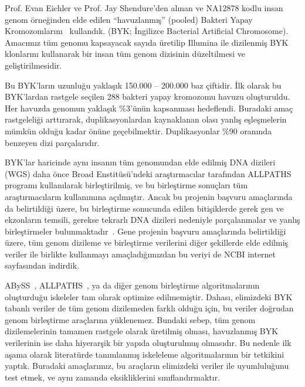 \documentclass[11pt]{article}
\begin{document}
Prof. Evan Eichler ve Prof. Jay Shendure'den alınan ve NA12878 kodlu insan genom örneğinden elde edilen ``havuzlanmış'' (pooled) Bakteri Yapay Kromozomlarını~\cite{Kitzman2011} kullandık. 
(BYK; İngilizce Bacterial Artificial Chromosome). 
Amacımız tüm genomu kapsayacak sayıda üretilip Illumina ile dizilenmiş BYK klonlarını kullanarak bir insan tüm genom dizisinin düzeltilmesi ve geliştirilmesidir.
	
Bu BYK’ların uzunluğu yaklaşık 150.000 – 200.000 baz çiftidir. İlk olarak bu BYK'lardan rastgele seçilen 288 bakteri yapay kromozomu havuzu oluşturuldu. Her havuzda genomun yaklaşık \%3'ünün 
kapsanması hedeflendi. Buradaki amaç rastgeleliği arttırarak, duplikasyonlardan kaynaklanan olası yanlış eşleşmelerin mümkün olduğu kadar önüne geçebilmektir. 
Duplikasyonlar \%90 oranında benzeyen dizi parçalarıdır. 

BYK’lar haricinde aynı insanın tüm genomundan elde edilmiş DNA dizileri (WGS) daha önce Broad Enstitüsü’ndeki araştırmacılar tarafından ALLPATHS~\cite{Gnerre2011} programı kullanılarak birleştirilmiş, ve bu birleştirme sonuçları tüm araştırmacıların kullanımına açılmıştır. Ancak bu projenin başvuru amaçlarında da belirtildiği üzere, bu birleştirme sonucunda edilen bitişiklerde gerek gen ve ekzonların temsili, gerekse tekrarlı DNA dizileri nedeniyle parçalanmalar ve yanlış birleştirmeler bulunmaktadır~\cite{Alkan2011c}. Gene projenin başvuru amaçlarında belirtildiği üzere, tüm genom dizileme ve birleştirme verilerini diğer şekillerde elde edilmiş veriler ile birlikte kullanmayı amaçladığımızdan bu veriyi de NCBI internet sayfasından indirdik.

ABySS~\cite{Simpson2009}, ALLPATHS~\cite{Simpson2009}, ya da diğer genom birleştirme algoritmalarının oluşturduğu iskeleler tam olarak optimize edilmemiştir. Dahası, elimizdeki BYK tabanlı veriler de tüm genom dizilemeden farklı olduğu için, bu veriler doğrudan genom birleştirme araçlarına yüklenemez. Bundaki sebep, tüm genom dizilemelerinin tamamen rastgele olarak üretilmiş olması, havuzlanmış BYK verilerinin ise daha hiyerarşik bir yapıda oluşturulmuş olmasıdır. Bu nedenle ilk aşama olarak literatürde tanımlanmış iskeleleme algoritmalarının bir tetkikini yaptık. Buradaki amaçlarımız, bu araçların elimizdeki veriler ile uyumluluğunu test etmek, ve aynı zamanda eksikliklerini sınıflandırmaktır.
\end{document}
